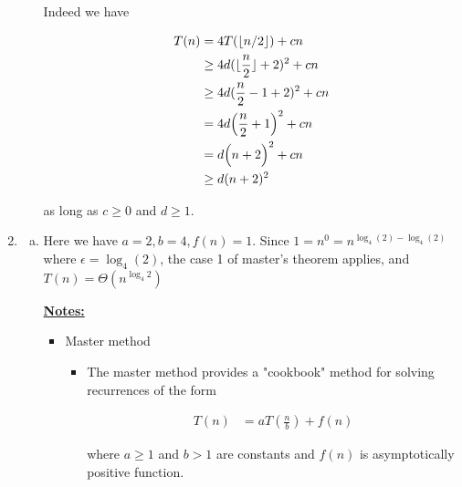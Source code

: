 \documentclass[12pt]{article}
\begin{document}
\begin{enumerate}[1.]
\begin{enumerate}[1.]
\begin{mdframed}
        \bigskip

        Indeed we have

        \begin{align}
            T(n) &= 4T(\lfloor n/2 \rfloor) + cn\\
            &\geq 4d (\lfloor \frac{n}{2} \rfloor + 2)^2 + cn\\
            &\geq 4d (\frac{n}{2} - 1 + 2)^2 + cn\\
            &= 4d \Bigl( \frac{n}{2} + 1 \Bigr)^2 + cn\\
            &= d \Bigl( n + 2 \Bigr)^2 + cn\\
            &\geq d(n+2)^2
        \end{align}

        \bigskip

        as long as $c \geq 0$ and $d \geq 1$.

        \end{mdframed}

    \end{enumerate}

    \item
    \setcounter{equation}{0}
    \bigskip

    \begin{enumerate}[a)]

        \item

        Here we have $a = 2, b = 4, f(n) = 1$. Since $1 = n^0 = n^{\log_4(2) - \log_4(2)}$ where $\epsilon = \log_4(2)$,
        the case 1 of master's theorem applies, and $T(n) = \Theta(n^{\log_4 2})$

        \bigskip

        \underline{\textbf{Notes:}}

        \bigskip

        \begin{itemize}
            \item Master method

            \begin{itemize}
                \item The master method provides a "cookbook" method for solving recurrences of the
                form


                \begin{align}
                    T(n) &= aT(\frac{n}{b}) + f(n)
                \end{align}

                where $a \geq 1$ and $b > 1$ are constants and $f(n)$ is asymptotically positive function.


\end{itemize}
\end{itemize}
\end{enumerate}
\end{enumerate}
\end{document}
